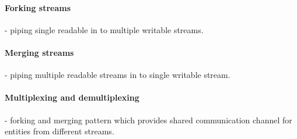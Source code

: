 \paragraph{Forking streams} - piping single readable in to multiple writable streams.\cite{nodejsbook}
\paragraph{Merging streams} - piping multiple readable streams in to single writable stream.\cite{nodejsbook}
\paragraph{Multiplexing and demultiplexing} - forking and merging pattern which provides shared communication channel for entities from different streams.\cite{nodejsbook}
\cite{nodejsbook}

